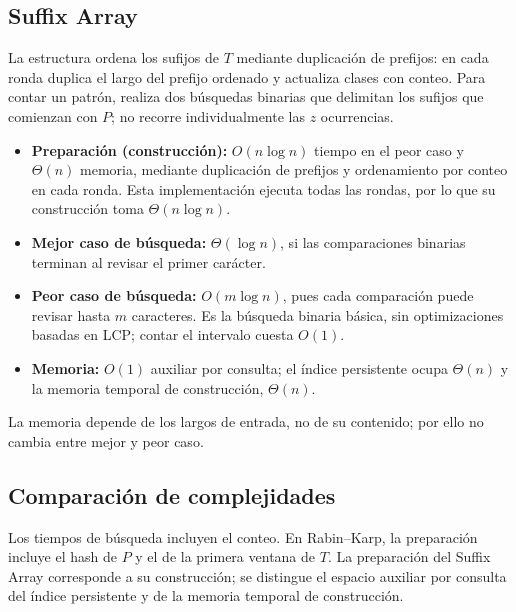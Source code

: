 \subsection{Suffix Array}

La estructura ordena los sufijos de \(T\) mediante duplicación de prefijos:
en cada ronda duplica el largo del prefijo ordenado y actualiza clases con
conteo. Para contar un patrón, realiza dos búsquedas binarias que delimitan
    los sufijos que comienzan con \(P\); no recorre individualmente las
\(z\) ocurrencias.

\begin{itemize}
    \item \textbf{Preparación (construcción):} \(O(n \log n)\) tiempo en el
    peor caso y \(\Theta(n)\) memoria, mediante duplicación de prefijos y
    ordenamiento por conteo en cada ronda. Esta implementación ejecuta todas
    las rondas, por lo que su construcción toma \(\Theta(n \log n)\).
    \item \textbf{Mejor caso de búsqueda:} \(\Theta(\log n)\), si las
    comparaciones binarias terminan al revisar el primer carácter.
    \item \textbf{Peor caso de búsqueda:} \(O(m \log n)\), pues cada comparación
    puede revisar hasta \(m\) caracteres. Es la búsqueda binaria básica, sin
    optimizaciones basadas en LCP; contar el intervalo cuesta \(O(1)\).
    \item \textbf{Memoria:} \(O(1)\) auxiliar por consulta; el índice
    persistente ocupa \(\Theta(n)\) y la memoria temporal de construcción,
    \(\Theta(n)\).
\end{itemize}

La memoria depende de los largos de entrada, no de su contenido; por ello no
cambia entre mejor y peor caso.

\subsection{Comparación de complejidades}

Los tiempos de búsqueda incluyen el conteo. En Rabin--Karp, la preparación
incluye el hash de \(P\) y el de la primera ventana de \(T\). La preparación del
Suffix Array corresponde a su construcción; se distingue el espacio auxiliar
por consulta del índice persistente y de la memoria temporal de construcción.


